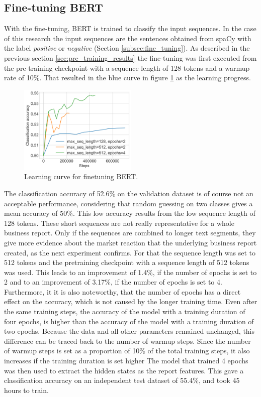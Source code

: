 \subsection{Fine-tuning \ac{BERT}}
\label{sec:fine_tuning_results}
With the fine-tuning, \ac{BERT} is trained to classify the input sequences.
In the case of this research the input sequences are the sentences obtained from spaCy with the label \textit{positive} or \textit{negative} (Section \ref{subsec:fine_tuning}).
As described in the previous section \ref{sec:pre_training_results} the fine-tuning was first executed from the pre-training checkpoint with a sequence length of 128 tokens and a warmup rate of 10\%.
That resulted in the blue curve in figure \ref{figure:bert_finetuning_learning} as the learning progress.
\begin{figure}[h]
    \centering
    \includegraphics[width=0.5\textwidth]{figures/charts/finetuning_learning.png}
    \caption{Learning curve for finetuning \ac{BERT}.}
    \label{figure:bert_finetuning_learning}
\end{figure}
The classification accuracy of 52.6\% on the validation dataset is of course not an acceptable performance, considering that random guessing on two classes gives a mean accuracy of 50\%.
This low accuracy results from the low sequence length of 128 tokens.
These short sequences are not really representative for a whole business report.
Only if the sequences are combined to longer text segments, they give more evidence about the market reaction that the underlying business report created, as the next experiment confirms.
For that the sequence length was set to 512 tokens and the pretraining checkpoint with a sequence length of 512 tokens was used.
This leads to an improvement of 1.4\%, if the number of epochs is set to 2 and to an improvement of 3.17\%, if the number of epochs is set to 4.
Furthermore, it it is also noteworthy, that the number of epochs has a direct effect on the accuracy, which is not caused by the longer training time.
Even after the same training steps, the accuracy of the model with a training duration of four epochs, is higher than the accuracy of the model with a training duration of two epochs.
Because the data and all other parameters remained unchanged, this difference can be traced back to the number of warmup steps.
Since the number of warmup steps is set as a proportion of 10\% of the total training steps, it also increases if the training duration is set higher
The model that trained 4 epochs was then used to extract the hidden states as the report features.
This gave a classification accuracy on an independent test dataset of 55.4\%, and took 45 hours to train.

